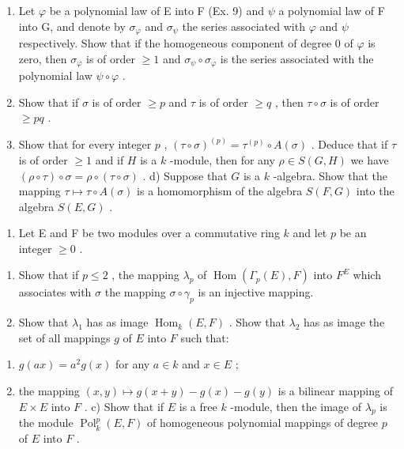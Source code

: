 \begin{enumerate}
\def\labelenumi{\alph{enumi})}
\item
  Let \(\varphi\) be a polynomial law of E into F (Ex. 9) and \(\psi\) a polynomial law of F into G, and denote by \(\sigma_{\varphi}\) and \(\sigma_{\psi}\) the series associated with \(\varphi\) and \(\psi\) respectively. Show that if the homogeneous component of degree 0 of \(\varphi\) is zero, then \(\sigma_{\varphi}\) is of order \(\geqslant 1\) and \(\sigma_{\psi} \circ \sigma_{\varphi}\) is the series associated with the polynomial law \(\psi \circ \varphi\) .
\item
  Show that if \(\sigma\) is of order \(\geqslant p\) and \(\tau\) is of order \(\geqslant q\) , then \(\tau \circ \sigma\) is of order \(\geqslant pq\) .
\item
  Show that for every integer \(p\) , \((\tau \circ \sigma)^{(p)} = \tau^{(p)} \circ A(\sigma)\) . Deduce that if \(\tau\) is of order \(\geqslant 1\) and if \(H\) is a \(k\) -module, then for any \(\rho \in S(G, H)\) we have \((\rho \circ \tau) \circ \sigma = \rho \circ (\tau \circ \sigma)\) . d) Suppose that \(G\) is a \(k\) -algebra. Show that the mapping \(\tau \mapsto \tau \circ A(\sigma)\) is a homomorphism of the algebra \(S(F, G)\) into the algebra \(S(E, G)\) .
\end{enumerate}

\begin{enumerate}
\def\labelenumi{\arabic{enumi})}
\setcounter{enumi}{15}
\tightlist
\item
  Let E and F be two modules over a commutative ring \(k\) and let \(p\) be an integer \(\geqslant 0\) .
\end{enumerate}

\begin{enumerate}
\def\labelenumi{\alph{enumi})}
\item
  Show that if \(p \leqslant 2\) , the mapping \(\lambda_p\) of \(\operatorname{Hom}(\Gamma_p(E), F)\) into \(F^E\) which associates with \(\sigma\) the mapping \(\sigma \circ \gamma_p\) is an injective mapping.
\item
  Show that \(\lambda_1\) has as image \(\operatorname{Hom}_k(E, F)\) . Show that \(\lambda_2\) has as image the set of all mappings \(g\) of \(E\) into \(F\) such that:
\end{enumerate}

\begin{enumerate}
\def\labelenumi{(\roman{enumi})}
\item
  \(g(ax) = a^2 g(x)\) for any \(a \in k\) and \(x \in E\) ;
\item
  the mapping \((x, y) \mapsto g(x + y) - g(x) - g(y)\) is a bilinear mapping of \(E \times E\) into \(F\) . c) Show that if \(E\) is a free \(k\) -module, then the image of \(\lambda_p\) is the module \(\operatorname{Pol}_k^p(E, F)\) of homogeneous polynomial mappings of degree \(p\) of \(E\) into \(F\) .
\end{enumerate}

